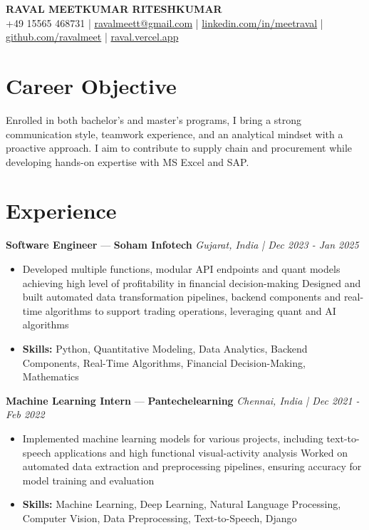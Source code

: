 \documentclass[a4paper,10pt]{article}
\begin{document}
\begin{center}
  {\Large\bfseries RAVAL MEETKUMAR RITESHKUMAR}\\[2pt]
  {\small +49 15565 468731 \;|\; \href{mailto:ravalmeett@gmail.com}{ravalmeett@gmail.com} \;|\; \href{https://www.linkedin.com/in/meetraval/}{linkedin.com/in/meetraval} \;|\; \href{https://github.com/ravalmeet}{github.com/ravalmeet} \;|\; \href{https://raval.vercel.app/}{raval.vercel.app}}
\end{center}
\vspace{-3pt}

\section*{Career Objective}
Enrolled in both bachelor's and master's programs, I bring a strong communication style, teamwork experience, and an analytical mindset with a proactive approach. I aim to contribute to supply chain and procurement while developing hands-on expertise with MS Excel and SAP.\par

\section*{Experience}
\textbf{Software Engineer} — \textbf{Soham Infotech} \hfill \textit{Gujarat, India \;|\; Dec 2023 - Jan 2025}\par
\vspace{1pt}
\begin{itemize}
  \item Developed multiple functions, modular API endpoints and quant models achieving high level of profitability in financial decision-making Designed and built automated data transformation pipelines, backend components and real-time algorithms to support trading operations, leveraging quant and AI algorithms
  \item \textbf{Skills:} Python, Quantitative Modeling, Data Analytics, Backend Components, Real-Time Algorithms, Financial Decision-Making, Mathematics
\end{itemize}
\vspace{3pt}
\textbf{Machine Learning Intern} — \textbf{Pantechelearning} \hfill \textit{Chennai, India \;|\; Dec 2021 - Feb 2022}\par
\vspace{1pt}
\begin{itemize}
  \item Implemented machine learning models for various projects, including text-to-speech applications and high functional visual-activity analysis Worked on automated data extraction and preprocessing pipelines, ensuring accuracy for model training and evaluation
  \item \textbf{Skills:} Machine Learning, Deep Learning, Natural Language Processing, Computer Vision, Data Preprocessing, Text-to-Speech, Django
\end{itemize}
\end{document}
